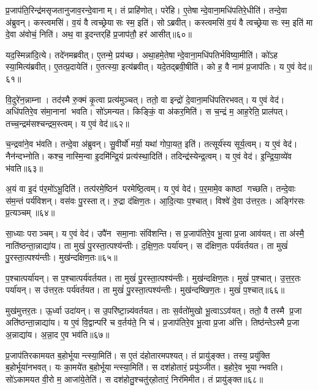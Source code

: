 प्र॒जाप॑ति॒रिन्द्र॑मसृजतानुजाव॒रन्दे॒वानाम्।
तं प्राहि॑णोत्।
परे॑हि।
ए॒तेषान्दे॒वाना॒मधि॑पतिरे॒धीति॑।
तन्दे॒वा अ॑ब्रुवन्।
कस्त्वमसि॑।
व॒यं वै त्वच्छ्रेयासः स्म॒ इति॑।
सोऽब्रवीत्।
कस्त्वमसि॑ व॒यं वै त्वच्छ्रेयासः स्म॒ इति॑ मा दे॒वा अ॑वोचं॒ निति॑।
अथ॒ वा इ॒दन्तर्‌हि॑ प्र॒जाप॑तौ॒ हर॑ आसीत्॥६०॥

यद॒स्मिन्ना॑दि॒त्ये।
तदे॑नमब्रवीत्।
ए॒तन्मे॒ प्रय॑च्छ।
अथा॒हमे॒तेषान्दे॒वाना॒मधि॑पतिर्भविष्या॒मीति॑।
को॑ऽह स्या॒मित्य॑ब्रवीत्।
ए॒तत्प्र॒दायेति॑।
ए॒तत्स्या॒ इत्य॑ब्रवीत्।
यदे॒तद्ब्रवी॒षीति॑।
को ह॒ वै नाम॑ प्र॒जाप॑तिः।
य ए॒वं वेद॑॥६१॥

वि॒दुरे॑न॒न्नाम्ना।
तद॑स्मै रु॒क्मं कृ॒त्वा प्रत्य॑मुञ्चत्।
ततो॒ वा इन्द्रो॑ दे॒वाना॒मधि॑पतिरभवत्।
य ए॒वं वेद॑।
अधि॑पतिरे॒व स॑मा॒नानां भवति।
सो॑ऽमन्यत।
किङ्किं॒ वा अ॑कर॒मिति॑।
स च॒न्द्रं म॒ आह॒रेति॒ प्राल॑पत्।
तच्च॒न्द्रम॑सश्चन्द्रम॒स्त्वम्।
य ए॒वं वेद॑॥६२॥

च॒न्द्रवा॑ने॒व भ॑वति।
तन्दे॒वा अ॑ब्रुवन्।
सु॒वीर्यो॑ मर्या॒ यथा॑ गोपा॒यत॒ इति॑।
तत्सूर्य॑स्य सूर्य॒त्वम्।
य ए॒वं वेद॑।
नैन॑न्दभ्नोति।
कश्च॒ नास्मि॒न्वा इ॒दमि॑न्द्रि॒यं प्रत्य॑स्था॒दिति॑।
तदिन्द्र॑स्येन्द्र॒त्वम्।
य ए॒वं वेद॑।
इ॒न्द्रि॒या॒व्ये॑व भ॑वति॥६३॥

अ॒यं वा इ॒दं प॑र॒मो॑ऽभू॒दिति॑।
तत्प॑रमे॒ष्ठिन॑ परमेष्ठि॒त्वम्।
य ए॒वं वेद॑।
प॒र॒मामे॒व काष्ठां गच्छति।
तन्दे॒वाः स॑म॒न्तं पर्य॑विशन्।
वस॑वः पु॒रस्तात्।
रु॒द्रा द॑क्षिण॒तः।
आ॒दि॒त्याः प॒श्चात्।
विश्वे॑ दे॒वा उ॑त्तर॒तः।
अङ्गि॑रसः प्र॒त्यञ्चम्॥६४॥

सा॒ध्याः पराञ्चम्।
य ए॒वं वेद॑।
उपै॑न समा॒नाः संवि॑शन्ति।
स प्र॒जाप॑तिरे॒व भू॒त्वा प्र॒जा आव॑यत्।
ता अ॑स्मै॒ नाति॑ष्ठन्ता॒न्नाद्या॑य।
ता मुखं॑ पु॒रस्ता॒त्पश्य॑न्तीः।
द॒क्षि॒ण॒तः पर्या॑यन्।
स द॑क्षिण॒तः पर्य॑वर्तयत।
ता मुखं॑ पु॒रस्ता॒त्पश्य॑न्तीः।
मुख॑न्दक्षिण॒तः॥६५॥

प॒श्चात्पर्या॑यन्।
स प॒श्चात्पर्य॑वर्तयत।
ता मुखं॑ पु॒रस्ता॒त्पश्य॑न्तीः।
मुख॑न्दक्षिण॒तः।
मुखं॑ प॒श्चात्।
उ॒त्त॒र॒तः पर्या॑यन्।
स उ॑त्तर॒तः पर्य॑वर्तयत।
ता मुखं॑ पु॒रस्ता॒त्पश्य॑न्तीः।
मुख॑न्दष्खिण॒तः।
मुखं॑ प॒श्चात्॥६६॥

मुख॑मुत्तर॒तः।
ऊ॒र्ध्वा उदा॑यन्।
स उ॒परि॑ष्टा॒न्न्य॑वर्तयत।
ताः स॒र्वतो॑मुखो भू॒त्वाऽऽव॑यत्।
ततो॒ वै तस्मै प्र॒जा अति॑ष्ठन्ता॒न्नाद्या॑य।
य ए॒वं वि॒द्वान्परि॑ च व॒र्तय॑ते॒ नि च॑।
प्र॒जाप॑तिरे॒व भू॒त्वा प्र॒जा अ॑त्ति।
तिष्ठ॑न्तेऽस्मै प्र॒जा अ॒न्नाद्या॑य।
अ॒न्ना॒द ए॒व भव॑ति॥६७॥\anuvakamend[आ॒सी॒द्वेद॑ चन्द्रम॒स्त्वं य ए॒वं वेदेन्द्रिया॒व्ये॑व भ॑वति प्र॒त्यञ्चं॒ मुख॑न्दक्षिण॒तो मुखं॑ प॒श्चान्नव॑ च]

प्र॒जाप॑तिरकामयत ब॒होर्भूयान्त्स्या॒मिति॑।
स ए॒तं द॑होतारमपश्यत्।
तं प्रायु॑ङ्क्त।
तस्य॒ प्रयु॑क्ति ब॒होर्भूया॑नभवत्।
यः का॒मये॑त ब॒होर्भूयान्त्स्या॒मिति॑।
स दश॑होतारं॒ प्रयु॑ञ्जीत।
ब॒होरे॒व भूयान्भवति।
सो॑ऽकामयत वी॒रो म॒ आजा॑ये॒तेति॑।
स दश॑होतु॒श्चतु॑र्‌होतारं॒ निर॑मिमीत।
तं प्रायु॑ङ्क्त॥६८॥

